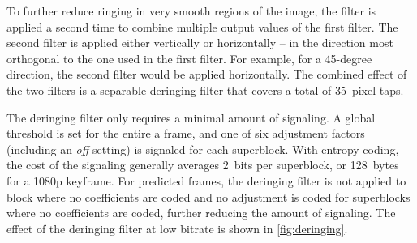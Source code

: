 \documentclass[english,conference,10pt]{IEEEtran}
\begin{document}
To further reduce ringing in very smooth regions of the image, the filter
is applied a second time to combine multiple output values of the
first filter. The second filter is applied either vertically or horizontally
-- in the direction most orthogonal to the one used in the first filter.
For example, for a 45-degree direction, the second filter would be
applied horizontally. The combined effect of the two filters is a separable
deringing filter that covers a total of 35~pixel taps.

The deringing filter only requires a minimal amount of signaling. A global threshold
is set for the entire a frame, and one of six adjustment factors (including an
\textit{off} setting) is signaled for each superblock. With entropy coding, the
cost of the signaling generally averages 2~bits per superblock, or 128~bytes for
a 1080p keyframe. For predicted frames, the deringing filter is not applied to
block where no coefficients are coded and no adjustment is coded for superblocks
where no coefficients are coded, further reducing the amount of signaling. The
effect of the deringing filter at low bitrate is shown in \cref{fig:deringing}.
\end{document}
